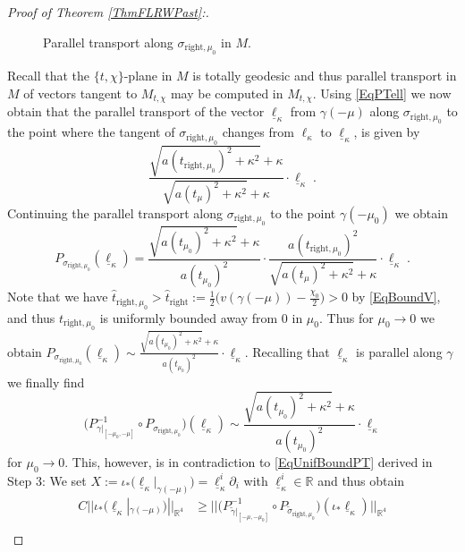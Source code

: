 \documentclass[reqno]{article}
\newcommand{\R}{\mathbb{R}}
\begin{document}
\begin{proof}[Proof of Theorem \ref{ThmFLRWPast}:]
\begin{figure}[h]
\centering
 \def\svgwidth{7cm}
   
      \caption{Parallel transport along $\sigma_{\mathrm{right},\mu_0}$ in $M$.} \label{FigHolonomyTChi}
\end{figure}
Recall that the $\{t,\chi\}$-plane in $M$ is totally geodesic and thus parallel transport in $M$ of vectors tangent to $M_{t,\chi}$ may be computed in $M_{t,\chi}$. Using \eqref{EqPTell} we now obtain that the parallel transport of the vector $\underline{\ell}_\kappa$ from $\gamma(-\mu)$ along $\sigma_{\mathrm{right},\mu_0}$ to the point where the tangent of $\sigma_{\mathrm{right},\mu_0}$  changes from $\ell_\kappa$ to $\underline{\ell}_\kappa$,  is given by $$\frac{\sqrt{a(t_{\mathrm{right}, \mu_0})^2 + \kappa^2} + \kappa}{\sqrt{a(t_\mu)^2 + \kappa^2} + \kappa} \cdot \underline{\ell}_\kappa \;.$$ Continuing the parallel transport along $\sigma_{\mathrm{right},\mu_0}$ to the point $\gamma(-\mu_0)$ we obtain
\begin{equation*}
P_{\sigma_{\mathrm{right}, \mu_0}} (\underline{\ell}_\kappa) =  \frac{\sqrt{a(t_{\mu_0})^2 + \kappa^2} + \kappa}{a(t_{\mu_0})^2} \cdot \frac{a(t_{\mathrm{right}, \mu_0})^2}{\sqrt{a(t_\mu)^2 + \kappa^2} + \kappa} \cdot \underline{\ell}_\kappa \;.
\end{equation*}
Note that we have $\hat{t}_{\mathrm{right},\mu_0} > \hat{t}_{\mathrm{right}} := \frac{1}{2}\big(v(\gamma(-\mu)) - \frac{\chi_0}{2}\big) >0$ by \eqref{EqBoundV}, and thus $t_{\mathrm{right}, \mu_0}$ is uniformly bounded away from $0$ in $\mu_0$.
Thus for $\mu_0 \to 0$ we obtain $P_{\sigma_{\mathrm{right}, \mu_0}} (\underline{\ell}_\kappa) \sim \frac{\sqrt{a(t_{\mu_0})^2 + \kappa^2} + \kappa}{a(t_{\mu_0})^2} \cdot \underline{\ell}_\kappa$. Recalling that $\underline{\ell}_\kappa$ is parallel along $\gamma$ we finally find
\begin{equation*}
\big(P^{-1}_{\gamma|_{[-\mu_0,-\mu]}} \circ P_{\sigma_{\mathrm{right}, \mu_0}}\big) (\underline{\ell}_\kappa) \sim \frac{\sqrt{a(t_{\mu_0})^2 + \kappa^2} + \kappa}{a(t_{\mu_0})^2} \cdot \underline{\ell}_\kappa 
\end{equation*}
for $\mu_0 \to 0$. This, however, is in contradiction to \eqref{EqUnifBoundPT} derived in Step 3: We set $X:= \iota_* \Big(\underline{\ell}_\kappa|_{\gamma(-\mu)} \Big)= \underline{\ell}_\kappa^i \partial_i $ with $\underline{\ell}_\kappa^i \in \R$ and thus obtain 
\begin{equation*}
\begin{split}
C ||\iota_* \Big(\underline{\ell}_\kappa|_{\gamma(-\mu)}\Big)||_{\R^4} &\geq  ||\big(P^{-1}_{\tilde{\gamma}|_{[-\mu,-\mu_0]} }\circ P_{\tilde{\sigma}_{\mathrm{right}, \mu_0}} \big)(\iota_* \underline{\ell}_\kappa)||_{\R^4} \\

\end{split}
\end{equation*}
\end{proof}
\end{document}
